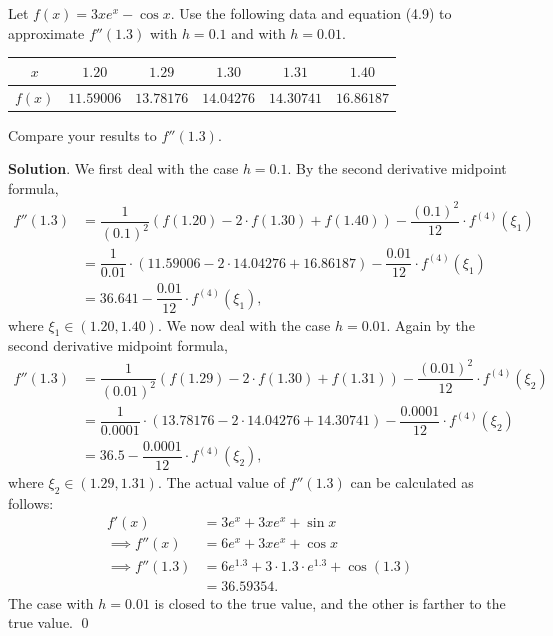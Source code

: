 \documentclass[11pt]{article}
\theoremstyle{break}
\numberwithin{equation}{theorem}
\begin{document}
\newpage
\begin{problem}\label{problem 2} %
    Let $f(x)=3xe^x-\cos x$. Use the following data and equation (4.9) to approximate $f''(1.3)$ with $h=0.1$ and with $h=0.01$.
    \begin{center}
        \begin{tabular}{c|c|c|c|c|c}
            $x$ & $1.20$ & $1.29$ & $1.30$ & $1.31$ & $1.40$ \\
            \hline
            $f(x)$ & $11.59006$ & $13.78176$ & $14.04276$ & $14.30741$ & $16.86187$
        \end{tabular}
    \end{center}
    Compare your results to $f''(1.3)$.
\end{problem}
\textbf{Solution}. We first deal with the case $h=0.1$. By the second derivative midpoint formula, \begin{align*}
    f''(1.3)&=\dfrac{1}{(0.1)^2}\left(f(1.20)-2\cdot f(1.30)+f(1.40)\right)-\dfrac{(0.1)^2}{12}\cdot f^{(4)}(\xi_1)\\
    &=\dfrac{1}{0.01}\cdot\left(11.59006-2\cdot14.04276+16.86187\right)-\dfrac{0.01}{12}\cdot f^{(4)}(\xi_1)\\
    &=36.641-\dfrac{0.01}{12}\cdot f^{(4)}(\xi_1),
\end{align*}
where $\xi_1\in(1.20, 1.40)$. We now deal with the case $h=0.01$. Again by the second derivative midpoint formula, \begin{align*}
    f''(1.3)&=\dfrac{1}{(0.01)^2}\left(f(1.29)-2\cdot f(1.30)+f(1.31)\right)-\dfrac{(0.01)^2}{12}\cdot f^{(4)}(\xi_2)\\
    &=\dfrac{1}{0.0001}\cdot\left(13.78176-2\cdot14.04276+14.30741\right)-\dfrac{0.0001}{12}\cdot f^{(4)}(\xi_2)\\
    &=36.5-\dfrac{0.0001}{12}\cdot f^{(4)}(\xi_2),
\end{align*}
where $\xi_2\in(1.29, 1.31)$. The actual value of $f''(1.3)$ can be calculated as follows:
\begin{align*}
    f'(x)&=3e^x+3xe^x+\sin x\\
    \implies f''(x)&=6e^x+3xe^x+\cos x\\
    \implies f''(1.3)&=6e^{1.3}+3\cdot1.3\cdot e^{1.3}+\cos(1.3)\\
    &=36.59354.
\end{align*}
The case with $h=0.01$ is closed to the true value, and the other is farther to the true value. \qed
\end{document}

